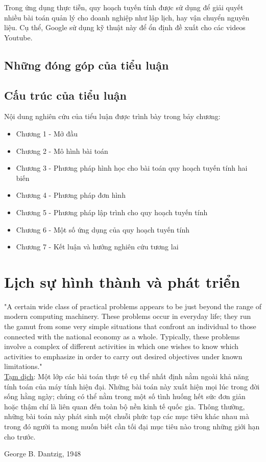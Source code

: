 Trong ứng dụng thực tiễn, quy hoạch tuyến tính được sử dụng để giải quyết nhiều bài toán quản lý cho doanh nghiệp như lập lịch, hay vận chuyển nguyên liệu. Cụ thể, Google sử dụng kỹ thuật này để ổn định đề xuất cho các videos Youtube.

\subsection{Những đóng góp của tiểu luận}

\subsection{Cấu trúc của tiểu luận}

Nội dung nghiên cứu của tiểu luận được trình bày trong bảy chương:
\begin{itemize}
    \item Chương 1 - Mở đầu
    \item Chương 2 - Mô hình bài toán
    \item Chương 3 - Phương pháp hình học cho bài toán quy hoạch tuyến tính hai biến
    \item Chương 4 - Phương pháp đơn hình
    \item Chương 5 - Phương pháp lập trình cho quy hoạch tuyến tính
    \item Chương 6 - Một số ứng dụng của quy hoạch tuyến tính
    \item Chương 7 - Kết luận và hướng nghiên cứu tương lai
\end{itemize}

\section{Lịch sự hình thành và phát triển}

\epigraph{"A certain wide class of practical problems appears to be just beyond the range of modern computing machinery. These problems occur in everyday life; they run the gamut from some very simple situations that confront an individual to those connected with the national economy as a whole. Typically, these problems involve a complex of different activities in which one wishes to know which activities to emphasize in order to carry out desired objectives under known limitations."
\\ \underline{Tạm dịch}: Một lớp các bài toán thực tế cụ thể nhất định nằm ngoài khả năng tính toán của máy tính hiện đại. Những bài toán này xuất hiện mọi lúc trong đời sống hằng ngày; chúng có thể nằm trong một số tình huống hết sức đơn giản hoặc thậm chí là liên quan đến toàn bộ nền kinh tế quốc gia. Thông thường, những bài toán này phát sinh một chuỗi phức tạp các mục tiêu khác nhau mà trong đó người ta mong muốn biết cần tối đại mục tiêu nào trong những giới hạn cho trước.
}{George B. Dantzig, 1948}

